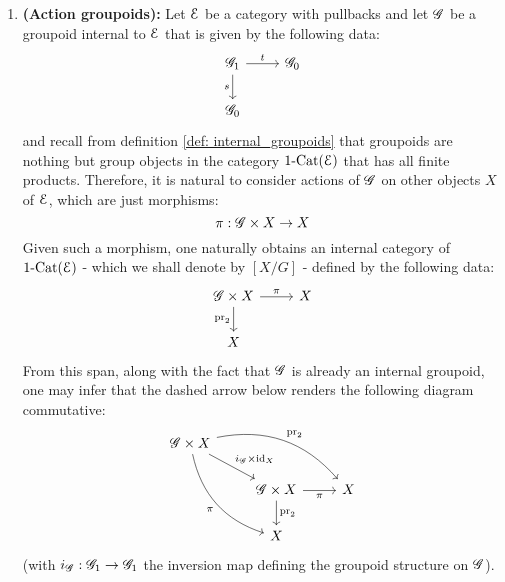             \begin{example} \label{example: internal_groupoids_and_equivalence_relations}
                \noindent
                \begin{enumerate}
                    \item \textbf{(Action groupoids):} Let $\mathcal{E}$ be a category with pullbacks and let $\mathscr{G}$ be a groupoid internal to $\mathcal{E}$ that is given by the following data:
                        $$
                            \begin{tikzcd}
                            	\scrG_1 & \scrG_0 \\
                            	\scrG_0
                            	\arrow["s"', from=1-1, to=2-1]
                            	\arrow["t", from=1-1, to=1-2]
                            \end{tikzcd}
                        $$
                    and recall from definition \ref{def: internal_groupoids} that groupoids are nothing but group objects in the category $1\text{-}\mathrm{Cat}(\mathcal{E})$ that has all finite products. Therefore, it is natural to consider actions of $\mathscr{G}$ on other objects $X$ of $\mathcal{E}$, which are just morphisms:
                        $$\pi: \scrG \x X \to X$$
                    Given such a morphism, one naturally obtains an internal category of $1\text{-}\mathrm{Cat}(\mathcal{E})$ - which we shall denote by $[X/G]$ - defined by the following data:
                        $$
                            \begin{tikzcd}
                            	\scrG \x X & X \\
                            	X
                            	\arrow["\pr_2"', from=1-1, to=2-1]
                            	\arrow["\pi", from=1-1, to=1-2]
                            \end{tikzcd}
                        $$
                    From this span, along with the fact that $\mathscr{G}$ is already an internal groupoid, one may infer that the dashed arrow below renders the following diagram commutative:
                        $$
                            \begin{tikzcd}
                                \scrG \x X \arrow[rd, "i_{\scrG} \x \id_X"] \arrow[rdd, "\pi"', bend right] \arrow[rrd, "\pr_2", bend left] &                                                 &   \\
                                                                                                                                                        & \scrG \x X \arrow[d, "\pr_2"] \arrow[r, "\pi"'] & X \\
                                                                                                                                                        & X                                               &  
                            \end{tikzcd}
                        $$
                    (with $i_{\mathscr{G}}: \mathscr{G}_1 \to \mathscr{G}_1$ the inversion map defining the groupoid structure on $\mathscr{G}$). 
                    

\end{enumerate}
\end{example}
